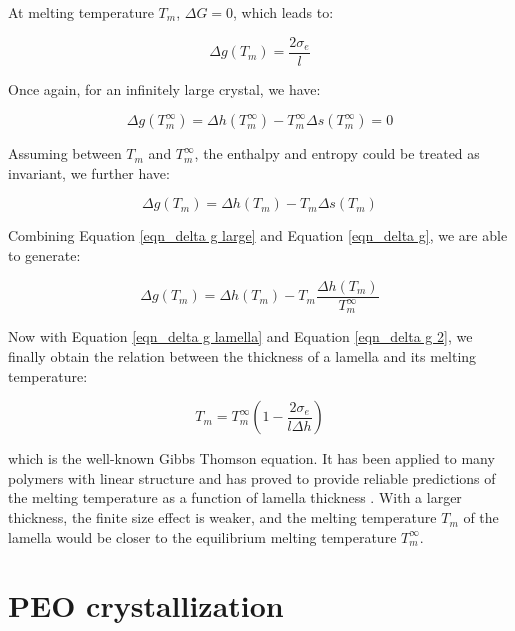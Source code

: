 At melting temperature $T_{m}$, $\Delta G = 0$, which leads to:

\begin{equation}
\label{eqn_delta g lamella}
\Delta g (T_{m}) = \dfrac{2\sigma_{e}}{l}
\end{equation}

Once again, for an infinitely large crystal, we have:

\begin{equation}
\label{eqn_delta g large}
\Delta g (T_{m}^{\infty}) = \Delta h (T_{m}^{\infty}) - T_{m}^{\infty}\Delta s (T_{m}^{\infty}) = 0
\end{equation}

Assuming between $T_{m}$ and $T_{m}^{\infty}$, the enthalpy and entropy could be treated as invariant, we further have:

\begin{equation}
\label{eqn_delta g}
\Delta g (T_{m}) = \Delta h (T_{m}) - T_{m}\Delta s (T_{m})
\end{equation}

Combining Equation \ref{eqn_delta g large} and Equation \ref{eqn_delta g}, we are able to generate:

\begin{equation}
\label{eqn_delta g 2}
\Delta g (T_{m}) = \Delta h (T_{m}) - T_{m}\dfrac{\Delta h (T_{m})}{T_{m}^{\infty}}
\end{equation}

Now with Equation \ref{eqn_delta g lamella} and Equation \ref{eqn_delta g 2}, we finally obtain the relation between the thickness of a lamella and its melting temperature:

\begin{equation}
\label{eqn_GT}
T_{m} = T_{m}^{\infty} (1 - \dfrac{2\sigma_{e}}{l \Delta h})
\end{equation}

\noindent
which is the well-known Gibbs Thomson equation. It has been applied to many polymers with linear structure and has proved to provide reliable predictions of the melting temperature as a function of lamella thickness \cite{KojiYamada2003}. With a larger thickness, the finite size effect is weaker, and the melting temperature $T_{m}$ of the lamella would be closer to the equilibrium melting temperature $T_{m}^{\infty}$.

\section{PEO crystallization}

